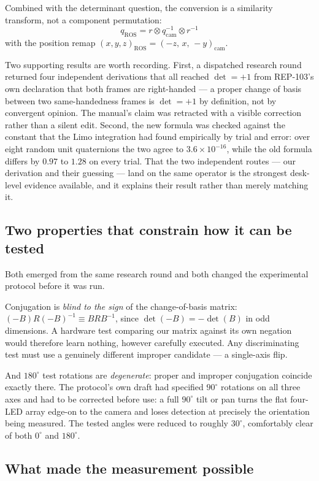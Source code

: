 \documentclass[11pt]{article}
\begin{document}
Combined with the determinant question, the conversion is a similarity
transform, not a component permutation:
\[
\boxed{\;q_{\text{ROS}} = r \otimes q_{\text{cam}}^{-1} \otimes r^{-1}\;}
\]
with the position remap $(x,y,z)_{\text{ROS}} = (-z,\, x,\, -y)_{\text{cam}}$.

Two supporting results are worth recording. First, a dispatched research
round returned four independent derivations that all reached $\det = +1$
from REP-103's own declaration that both frames are right-handed --- a
proper change of basis between two same-handedness frames is $\det=+1$ by
definition, not by convergent opinion. The manual's claim was retracted with
a visible correction rather than a silent edit. Second, the new formula was
checked against the constant that the Limo integration had found empirically
by trial and error: over eight random unit quaternions the two agree to
$3.6\times10^{-16}$, while the old formula differs by $0.97$ to $1.28$ on
every trial. That the two independent routes --- our derivation and their
guessing --- land on the same operator is the strongest desk-level evidence
available, and it explains their result rather than merely matching it.

\subsection{Two properties that constrain how it can be tested}

Both emerged from the same research round and both changed the experimental
protocol before it was run.

Conjugation is \emph{blind to the sign} of the change-of-basis matrix:
$(-B)R(-B)^{-1} \equiv BRB^{-1}$, since $\det(-B) = -\det(B)$ in odd
dimensions. A hardware test comparing our matrix against its own negation
would therefore learn nothing, however carefully executed. Any discriminating
test must use a genuinely different improper candidate --- a single-axis
flip.

And $180^\circ$ test rotations are \emph{degenerate}: proper and improper
conjugation coincide exactly there. The protocol's own draft had specified
$90^\circ$ rotations on all three axes and had to be corrected before use:
a full $90^\circ$ tilt or pan turns the flat four-LED array edge-on to the
camera and loses detection at precisely the orientation being measured. The
tested angles were reduced to roughly $30^\circ$, comfortably clear of both
$0^\circ$ and $180^\circ$.

\subsection{What made the measurement possible}
\end{document}
